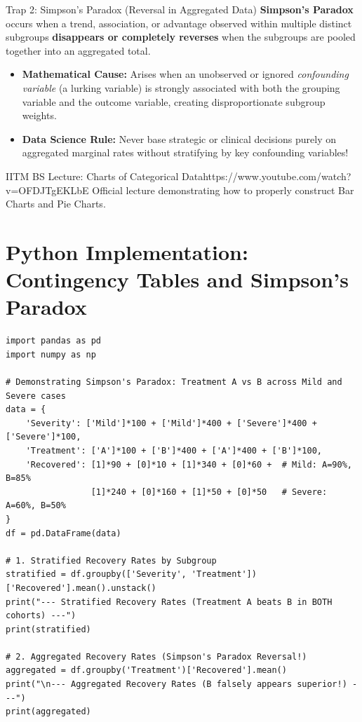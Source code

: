 \begin{trapbox}{Trap 2: Simpson's Paradox (Reversal in Aggregated Data)}
\textbf{Simpson's Paradox} occurs when a trend, association, or advantage observed within multiple distinct subgroups \textbf{disappears or completely reverses} when the subgroups are pooled together into an aggregated total.
\begin{itemize}
    \item \textbf{Mathematical Cause:} Arises when an unobserved or ignored \emph{confounding variable} (a lurking variable) is strongly associated with both the grouping variable and the outcome variable, creating disproportionate subgroup weights.
    \item \textbf{Data Science Rule:} Never base strategic or clinical decisions purely on aggregated marginal rates without stratifying by key confounding variables!
\end{itemize}
\end{trapbox}

\begin{videocard}{IITM BS Lecture: Charts of Categorical Data}{https://www.youtube.com/watch?v=OFDJTgEKLbE}
Official lecture demonstrating how to properly construct Bar Charts and Pie Charts.
\end{videocard}

\section{Python Implementation: Contingency Tables and Simpson's Paradox}

\begin{lstlisting}[caption={Contingency Tables, Normalization, and Simpson's Paradox in Python}]
import pandas as pd
import numpy as np

# Demonstrating Simpson's Paradox: Treatment A vs B across Mild and Severe cases
data = {
    'Severity': ['Mild']*100 + ['Mild']*400 + ['Severe']*400 + ['Severe']*100,
    'Treatment': ['A']*100 + ['B']*400 + ['A']*400 + ['B']*100,
    'Recovered': [1]*90 + [0]*10 + [1]*340 + [0]*60 +  # Mild: A=90%, B=85%
                 [1]*240 + [0]*160 + [1]*50 + [0]*50   # Severe: A=60%, B=50%
}
df = pd.DataFrame(data)

# 1. Stratified Recovery Rates by Subgroup
stratified = df.groupby(['Severity', 'Treatment'])['Recovered'].mean().unstack()
print("--- Stratified Recovery Rates (Treatment A beats B in BOTH cohorts) ---")
print(stratified)

# 2. Aggregated Recovery Rates (Simpson's Paradox Reversal!)
aggregated = df.groupby('Treatment')['Recovered'].mean()
print("\n--- Aggregated Recovery Rates (B falsely appears superior!) ---")
print(aggregated)
\end{lstlisting}


